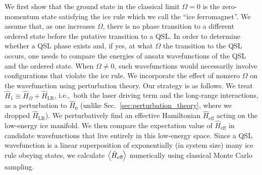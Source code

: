\documentclass[twocolumn,superscriptaddress,amsmath,amssymb,aps,prx,nofootinbib]{revtex4-2}
\begin{document}
We first show that the ground state in the classical limit $\Omega=0$ is the zero-momentum state satisfying the ice rule which we call the ``ice ferromagnet''. We assume that, as one increases $\Omega$, there is no phase transition to a different ordered state before the putative transition to a QSL. In order to determine whether a QSL phase exists and, if yes, at what $\Omega$ the transition to the QSL occurs, one needs to compare the energies of ansatz wavefunctions of the QSL and the ordered state. When $\Omega\neq 0$, such wavefunctions would necessarily involve configurations that violate the ice rule. We incorporate the effect of nonzero $\Omega$ on the wavefunction using perturbation theory. Our strategy is as follows. We treat $\hat{H}_1 \equiv \hat{H}_\Omega + \hat{H}_{\text{LR}}$, i.e.,~both the laser driving term and the long-range interactions, as a perturbation to $\hat{H}_0$ (unlike Sec.~\ref{sec:perturbation_theory}, where we dropped $\hat{H}_{\text{LR}}$). We perturbatively find an effective Hamiltonian $\hat{H}_{\text{eff}}$ acting on the low-energy ice manifold. We then compare the expectation value of $\hat{H}_{\text{eff}}$ in candidate wavefunctions that live entirely in this low-energy space. 
Since a QSL wavefunction is a linear superposition of exponentially (in system size) many ice rule obeying states, we calculate $\expval{\hat{H}_{\text{eff}}}$ numerically using classical Monte Carlo sampling.
\end{document}
